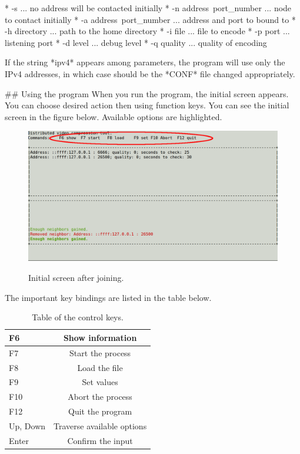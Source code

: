  * -s ... no address will be contacted initially
 * -n address~port_number ... node to contact initially
 * -a address~port_number ... address and port to bound to
 * -h directory ... path to the home directory
 * -i file ... file to encode
 * -p port ... listening port
 * -d level ... debug level
 * -q quality ... quality of encoding

If the string *ipv4* appears among parameters, the program will use only the IPv4 addresses,
in which case should be the *CONF* file changed appropriately.

## Using the program
When you run the program, the initial screen appears. You can choose desired action then using function keys. You can see the initial screen in the figure below. Available options are highlighted.
\begin{figure}[h]
\begin{center}
\includegraphics[scale=0.35]{./img/init-screen.pdf}
\label{initial-screen}
\caption[initial-screen]{Initial screen after joining.}
\end{center}
\end{figure}

The important key bindings are listed in the table below.
\begin{table}[h]
\begin{center}
 \begin{tabular}{ | l | c |}
   \hline
   F6 & Show information \\ \hline
   F7 & Start the process \\ \hline
   F8 & Load the file \\ \hline
   F9 & Set values \\ \hline
   F10 & Abort the process \\ \hline
   F12 & Quit the program \\ \hline
   Up, Down & Traverse available options \\ \hline
   Enter & Confirm the input \\
 	\hline
 \end{tabular}
 \caption{Table of the control keys.}
 \end{center}
\end{table}

